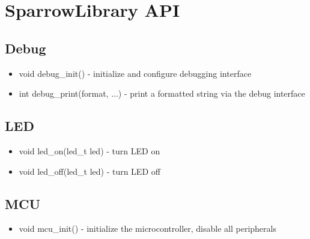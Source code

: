 
\chapter{SparrowLibrary API}

\section{Debug}
\begin{itemize}
	\item void debug\_init() - initialize and configure debugging interface
	\item int debug\_print(format, ...) - print a formatted string via the
		debug interface
\end{itemize}

\section{LED}
\begin{itemize}
	\item void led\_on(led\_t led) - turn LED on
	\item void led\_off(led\_t led) - turn LED off
\end{itemize}

\section{MCU}
\begin{itemize}
	\item void mcu\_init() - initialize the microcontroller, disable all
		peripherals
\end{itemize}

